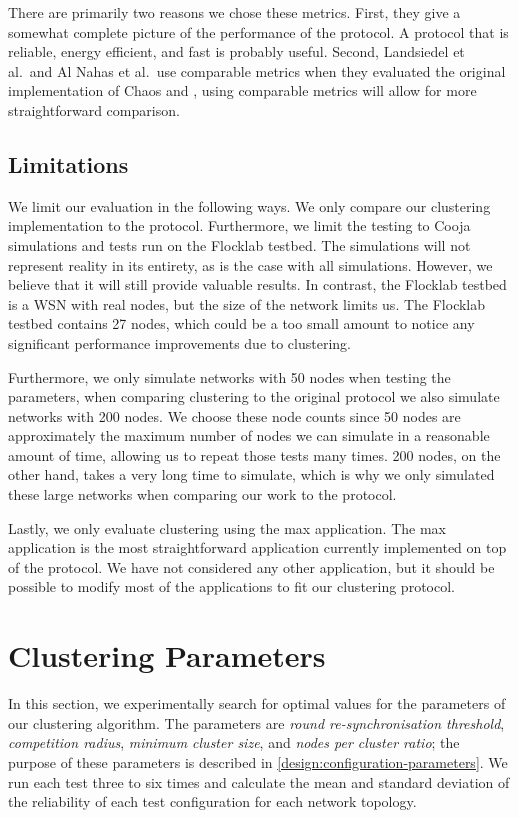 There are primarily two reasons we chose these metrics. First, they give a somewhat complete picture of the performance of the protocol. A protocol that is reliable, energy efficient, and fast is probably useful. Second, Landsiedel et al.~and Al Nahas et al.~use comparable metrics when they evaluated the original implementation of Chaos and \atwo{} \cite{chaos-introduction-paper, a2-introduction-paper}, using comparable metrics will allow for more straightforward comparison. 

\subsection{Limitations}
We limit our evaluation in the following ways. We only compare our clustering implementation to the \atwo{} protocol. Furthermore, we limit the testing to Cooja simulations and tests run on the Flocklab testbed. The simulations will not represent reality in its entirety, as is the case with all simulations. However, we believe that it will still provide valuable results. In contrast, the Flocklab testbed is a WSN with real nodes, but the size of the network limits us. The Flocklab testbed contains 27 nodes, which could be a too small amount to notice any significant performance improvements due to clustering.

Furthermore, we only simulate networks with 50 nodes when testing the parameters, when comparing clustering to the original \atwo{} protocol we also simulate networks with 200 nodes. We choose these node counts since 50 nodes are approximately the maximum number of nodes we can simulate in a reasonable amount of time, allowing us to repeat those tests many times. 200 nodes, on the other hand, takes a very long time to simulate, which is why we only simulated these large networks when comparing our work to the  \atwo{} protocol.

Lastly, we only evaluate clustering using the max application. The max application is the most straightforward application currently implemented on top of the \atwo{} protocol. We have not considered any other application, but it should be possible to modify most of the applications to fit our clustering protocol.

\section{Clustering Parameters}
\label{sec:clustering-parameters}
In this section, we experimentally search for optimal values for the parameters of our clustering algorithm. The parameters are \emph{round re-synchronisation threshold}, \emph{competition radius}, \emph{minimum cluster size}, and \emph{nodes per cluster ratio}; the purpose of these parameters is described in \cref{design:configuration-parameters}. We run each test three to six times and calculate the mean and standard deviation of the reliability of each test configuration for each network topology.

